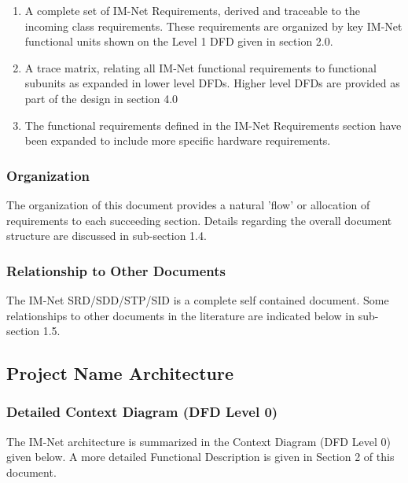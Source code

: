 \documentclass[letterpaper]{article}
\begin{document}
{\begin{enumerate}
\item  A complete set of IM-Net Requirements, derived and traceable to the incoming class requirements.  These requirements are organized by key IM-Net functional units shown on the Level 1 DFD given in section 2.0.

\item  A trace matrix, relating all IM-Net functional requirements to functional subunits as expanded in lower level DFDs. Higher level DFDs are provided as part of the design in section 4.0

\item  The functional requirements defined in the IM-Net Requirements section have been expanded to include more specific hardware requirements.
\end{enumerate}

\textcolor{subsubsection}{\subsubsection{Organization}}

The organization of this document provides a natural 'flow' or allocation of requirements to each succeeding section. Details regarding the overall document structure are discussed in sub-section 1.4.

\textcolor{subsubsection}{\subsubsection{Relationship to Other Documents}}

The IM-Net SRD/SDD/STP/SID is a complete self contained document. Some relationships to other documents in the literature are indicated below in sub-section 1.5.

\textcolor{subsection}{\subsection{Project Name Architecture}}
 
\textcolor{subsubsection}{\subsubsection{Detailed Context Diagram (DFD Level 0)}}

The IM-Net architecture is summarized in the Context Diagram (DFD Level 0) given below. A more detailed Functional Description is given in Section 2 of this document.\\

}
\end{document}
